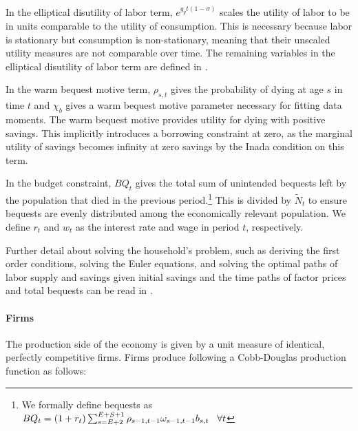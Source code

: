 \documentclass[10pt]{article}
\numberwithin{equation}{subsection}
\begin{document}
\begin{appendices}
\par In the elliptical disutility of labor term, \(e^{g_yt(1-\sigma)}\) scales the utility of labor to be in units comparable to the utility of consumption. This is necessary because labor is stationary but consumption is non-stationary, meaning that their unscaled utility measures are not comparable over time. The remaining variables in the elliptical disutility of labor term are defined in \cite{DE2018}.

\par In the warm bequest motive term, \(\rho_{s,t}\) gives the probability of dying at age \(s\) in time \(t\) and \(\chi_b\) gives a warm bequest motive parameter necessary for fitting data moments. The warm bequest motive provides utility for dying with positive savings. This implicitly introduces a borrowing constraint at zero, as the marginal utility of savings becomes infinity at zero savings by the Inada condition on this term.

\par In the budget constraint, \(BQ_t\) gives the total sum of unintended bequests left by the population that died in the previous period.\footnote{We formally define bequests as \(BQ_t = (1+r_t)\sum_{s=E+2}^{E+S+1}\rho_{s-1,t-1}\omega_{s-1,t-1}b_{s,t} \hspace{3mm} \forall t\)} This is divided by \(\tilde{N}_t\) to ensure bequests are evenly distributed among the economically relevant population. We define \(r_t\) and \(w_t\) as the interest rate and wage in period \(t\), respectively.

\par Further detail about solving the household's problem, such as deriving the first order conditions, solving the Euler equations, and solving the optimal paths of labor supply and savings given initial savings and the time paths of factor prices and total bequests can be read in \cite{E2020}.


\paragraph{Firms}

\par The production side of the economy is given by a unit measure of identical, perfectly competitive firms. Firms produce following a Cobb-Douglas production function as follows:


\end{appendices}
\end{document}
